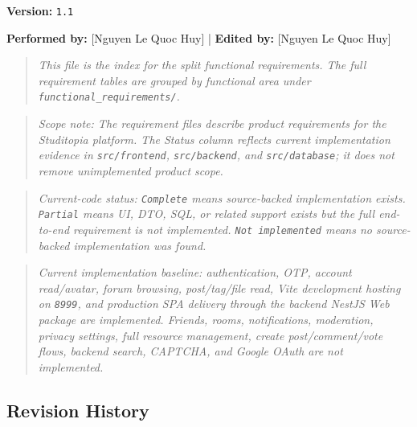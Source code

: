 \documentclass[12pt]{article}
\begin{document}
\textbf{Version:} \texttt{1.1}
\par\medskip

\textbf{Performed by:} [Nguyen Le Quoc Huy] | \textbf{Edited by:} [Nguyen Le Quoc Huy]
\par\medskip

\begin{quote}
\textit{This file is the index for the split functional requirements. The full requirement tables are grouped by functional area under \texttt{\texttt{functional\_requirements/}}.}
\end{quote}
\par\medskip

\begin{quote}
\textit{Scope note: The requirement files describe product requirements for the Studitopia platform. The Status column reflects current implementation evidence in \texttt{src/frontend}, \texttt{src/backend}, and \texttt{src/database}; it does not remove unimplemented product scope.}
\end{quote}
\par\medskip

\begin{quote}
\textit{Current-code status: \texttt{Complete} means source-backed implementation exists. \texttt{Partial} means UI, DTO, SQL, or related support exists but the full end-to-end requirement is not implemented. \texttt{Not implemented} means no source-backed implementation was found.}
\end{quote}
\par\medskip

\begin{quote}
\textit{Current implementation baseline: authentication, OTP, account read/avatar, forum browsing, post/tag/file read, Vite development hosting on \texttt{8999}, and production SPA delivery through the backend NestJS Web package are implemented. Friends, rooms, notifications, moderation, privacy settings, full resource management, create post/comment/vote flows, backend search, CAPTCHA, and Google OAuth are not implemented.}
\end{quote}
\par\medskip

\hypertarget{sec:revision-history}{}
\subsection*{Revision History}
\par\medskip
\end{document}
